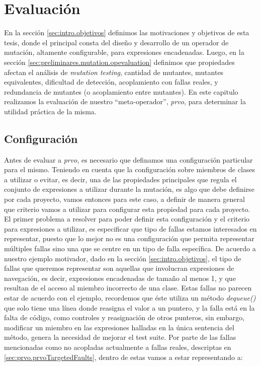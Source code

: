 \chapter[Evaluaci\'on]{Evaluaci\'on}
\label{sec:evaluation}

En la secci\'on \ref{sec:intro.objetivos} definimos las motivaciones y objetivos de esta tesis, donde el principal consta del dise\~no y desarrollo de un operador de mutaci\'on, altamente configurable, para expresiones encadenadas. Luego, en la secci\'on \ref{sec:preliminares.mutation.opevaluation} definimos que propiedades afectan el an\'alisis de \emph{mutation testing}, cantidad de mutantes, mutantes equivalentes, dificultad de detecci\'on, acoplamiento con fallas reales, y redundancia de mutantes (o acoplamiento entre mutantes). En este capitulo realizamos la evaluaci\'on de nuestro ``meta-operador'', \emph{prvo}, para determinar la utilidad pr\'actica de la misma.

\section{Configuraci\'on}
\label{sec:evaluation.prvoconfig}

Antes de evaluar a \emph{prvo}, es necesario que definamos una configuraci\'on particular para el mismo. Teniendo en cuenta que la configuraci\'on sobre miembros de clases a utilizar o evitar, es decir, una de las propiedades principales que regula el conjunto de expresiones a utilizar durante la mutaci\'on, es algo que debe definirse por cada proyecto, vamos entonces para este caso, a definir de manera general que criterio vamos a utilizar para configurar esta propiedad para cada proyecto. El primer problema a resolver para poder definir esta configuraci\'on y el criterio para expresiones a utilizar, es especificar que tipo de fallas estamos interesados en representar, puesto que lo mejor no es una configuraci\'on que permita representar m\'ultiples fallas sino una que se centre en un tipo de falla espec\'ifica. De acuerdo a nuestro ejemplo motivador, dado en la secci\'on \ref{sec:intro.objetivos}, el tipo de fallas que queremos representar son aquellas que involucran expresiones de navegaci\'on, es decir, expresiones encadenadas de tama\~no al menos 1, y que resultan de el acceso al miembro incorrecto de una clase. Estas fallas no parecen estar de acuerdo con el ejemplo, recordemos que \'este utiliza un m\'etodo \emph{dequeue()} que solo tiene una l\'inea donde reasigna el valor a un puntero, y la falla est\'a en la falta de c\'odigo, como controles y reasignaci\'on de otros punteros, sin embargo, modificar un miembro en las expresiones halladas en la \'unica sentencia del m\'etodo, genera la necesidad de mejorar el test suite. Por parte de las fallas mencionadas como no acopladas actualmente a fallas reales, descriptas en \ref{sec:prvo.prvoTargetedFaults}, dentro de estas vamos a estar representando a:

